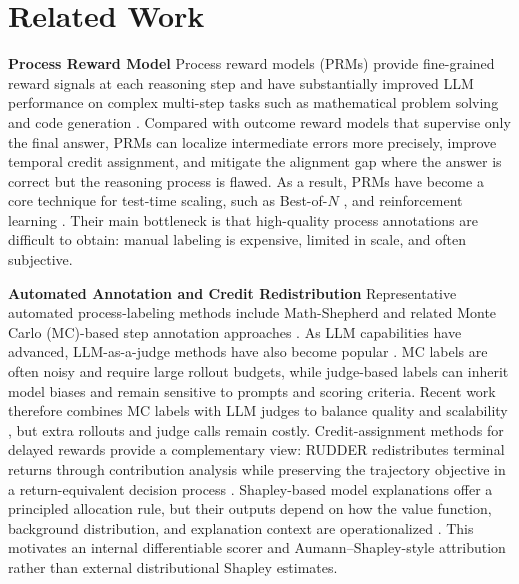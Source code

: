 \section{Related Work}

\textbf{Process Reward Model}
Process reward models (PRMs) provide fine-grained reward signals at each
reasoning step and have substantially improved LLM performance on complex
multi-step tasks such as mathematical problem solving and code generation
\citep{uesato2022solving, lightman2023lets}.
Compared with outcome reward models that supervise only the final answer, PRMs
can localize intermediate errors more precisely, improve temporal credit
assignment, and mitigate the alignment gap where the answer is correct but the
reasoning process is flawed.
As a result, PRMs have become a core technique for test-time scaling, such as
Best-of-\(N\) \citep{lin2025toolprmfinegrainedinferencescaling}, and
reinforcement learning
\citep{DBLP:conf/iclr/LiL25a, xi2025agentprmprocessrewardmodels, mit2025process}.
Their main bottleneck is that high-quality process annotations are difficult to
obtain: manual labeling is expensive, limited in scale, and often subjective.

\textbf{Automated Annotation and Credit Redistribution}
Representative automated process-labeling methods include Math-Shepherd
\citep{wang2024math} and related Monte Carlo (MC)-based step annotation
approaches
\citep{zhang2025process, zhang-etal-2025-lessons, chen-etal-2025-better-process, ding2025scan}.
As LLM capabilities have advanced, LLM-as-a-judge methods have also become
popular \citep{zeng2025versaprm, duan2025efficient}.
MC labels are often noisy and require large rollout budgets, while judge-based
labels can inherit model biases and remain sensitive to prompts and scoring
criteria.
Recent work therefore combines MC labels with LLM judges to balance quality and
scalability \citep{wang2025athena, zhang-etal-2025-lessons}, but extra rollouts
and judge calls remain costly.
Credit-assignment methods for delayed rewards provide a complementary view:
RUDDER redistributes terminal returns through contribution analysis while
preserving the trajectory objective in a return-equivalent decision process
\citep{arjona2019rudder}.
Shapley-based model explanations offer a principled allocation rule, but their
outputs depend on how the value function, background distribution, and
explanation context are operationalized \citep{pmlr-v119-sundararajan20b}.
This motivates an internal differentiable scorer and Aumann--Shapley-style
attribution rather than external distributional Shapley estimates.

